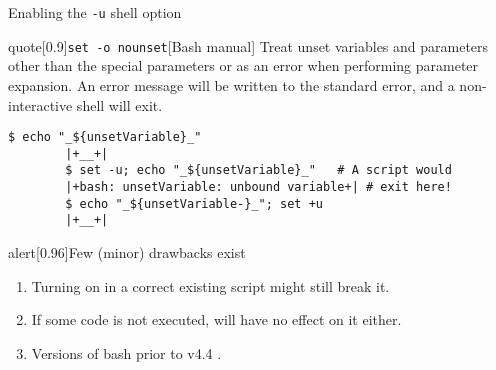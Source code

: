 \begin{frame}[fragile]{Enabling the \;\texttt{-u}\; shell option}
    \vspace{-3mm}
    \begin{varblock}{quote}[0.9\textwidth]{\texttt{set -o nounset}}[Bash manual]
        Treat unset variables and parameters other than the special parameters  or \PB{\texttt{*}} as an error when performing parameter expansion.
        An error message will be written to the standard error, and a non-interactive shell will exit.
    \end{varblock}
    \begin{lstlisting}[style=myBash, numbers=none, belowskip=-4mm]
        $ echo "_${unsetVariable}_"
        |+__+|
        $ set -u; echo "_${unsetVariable}_"   # A script would
        |+bash: unsetVariable: unbound variable+| # exit here!
        $ echo "_${unsetVariable-}_"; set +u
        |+__+|
    \end{lstlisting}
    \PrepareURLsymbol[PP]
    \begin{varblock}{alert}[0.96\textwidth]{Few (minor) drawbacks exist}
        \begin{enumerate}
            \small
            \item Turning  on in a correct existing script might still break it.
            \item If some code is not executed,  will have no effect on it either.
            \item Versions of bash \alert{prior to v4.4} .
        \end{enumerate}
    \end{varblock}
    \PrepareURLsymbol[PB]
\end{frame}
